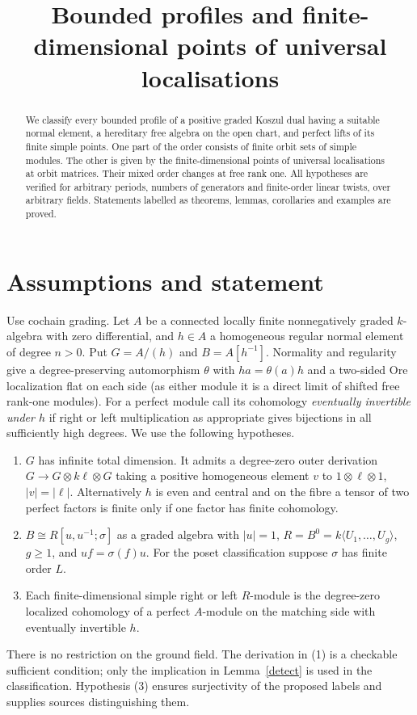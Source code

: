 \documentclass[11pt]{article}
\title{Bounded profiles and finite-dimensional points of universal localisations}
\author{\workingauthor}\date{\coursedate}
\begin{document}
\maketitle
\begin{abstract}
We classify every bounded profile of a positive graded Koszul dual
having a suitable normal element, a hereditary free algebra on the open
chart, and perfect lifts of its finite simple points. One part of the
order consists of finite orbit sets of simple modules. The other is given
by the finite-dimensional points of universal localisations at orbit
matrices. Their mixed order changes at free rank one. All hypotheses
are verified for arbitrary periods, numbers of generators and finite-order
linear twists, over arbitrary fields. Statements labelled as theorems,
lemmas, corollaries and examples are proved.
\end{abstract}

\section{Assumptions and statement}
Use cochain grading. Let $A$ be a connected locally finite
nonnegatively graded $k$-algebra with zero differential, and
$h\in A$ a homogeneous regular normal element of degree $n>0$.
Put $G=A/(h)$ and $B=A[h^{-1}]$. Normality and regularity give a
degree-preserving automorphism $\theta$ with $ha=\theta(a)h$ and a
two-sided Ore localization flat on each side (as either module it is
a direct limit of shifted free rank-one modules). For a perfect module
call its cohomology \emph{eventually invertible under $h$} if right or
left multiplication as appropriate gives bijections in all sufficiently
high degrees. We use the following hypotheses.
\begin{enumerate}
\item $G$ has infinite total dimension. It admits a degree-zero outer
derivation $G\to G\otimes k\ell\otimes G$ taking a positive homogeneous
element $v$ to $1\otimes\ell\otimes1$, $|v|=|\ell|$.
Alternatively $h$ is even and central and on the fibre a tensor of two
perfect factors is finite only if one factor has finite cohomology.
\item $B\cong R[u,u^{-1};\sigma]$ as a graded algebra with $|u|=1$,
$R=B^0=k\langle U_1,\ldots,U_g\rangle$, $g\ge1$, and $uf=\sigma(f)u$.
For the poset classification suppose $\sigma$ has finite order $L$.
\item Each finite-dimensional simple right or left $R$-module is the
degree-zero localized cohomology of a perfect $A$-module on the matching
side with eventually invertible $h$.
\end{enumerate}
There is no restriction on the ground field. The derivation in (1) is a
checkable sufficient condition; only the implication in Lemma~\ref{detect}
is used in the classification. Hypothesis (3) ensures surjectivity of
the proposed labels and supplies sources distinguishing them.
\end{document}

